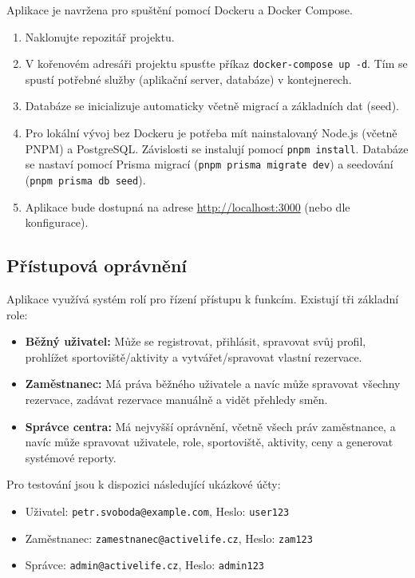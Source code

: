 \documentclass[12pt, a4paper]{article}
\begin{document}
Aplikace je navržena pro spuštění pomocí Dockeru a Docker Compose.

\begin{enumerate}
    \item Naklonujte repozitář projektu.
    \item V kořenovém adresáři projektu spusťte příkaz \texttt{docker-compose up -d}. Tím se spustí potřebné služby (aplikační server, databáze) v kontejnerech.
    \item Databáze se inicializuje automaticky včetně migrací a základních dat (seed).
    \item Pro lokální vývoj bez Dockeru je potřeba mít nainstalovaný Node.js (včetně PNPM) a PostgreSQL. Závislosti se instalují pomocí \texttt{pnpm install}. Databáze se nastaví pomocí Prisma migrací (\texttt{pnpm prisma migrate dev}) a seedování (\texttt{pnpm prisma db seed}).
    \item Aplikace bude dostupná na adrese \url{http://localhost:3000} (nebo dle konfigurace).
\end{enumerate}

\subsection{Přístupová oprávnění}
\label{subsec:pristupova_opravneni}

Aplikace využívá systém rolí pro řízení přístupu k funkcím. Existují tři základní role:

\begin{itemize}
    \item \textbf{Běžný uživatel:} Může se registrovat, přihlásit, spravovat svůj profil, prohlížet sportoviště/aktivity a vytvářet/spravovat vlastní rezervace.
    \item \textbf{Zaměstnanec:} Má práva běžného uživatele a navíc může spravovat všechny rezervace, zadávat rezervace manuálně a vidět přehledy směn.
    \item \textbf{Správce centra:} Má nejvyšší oprávnění, včetně všech práv zaměstnance, a navíc může spravovat uživatele, role, sportoviště, aktivity, ceny a generovat systémové reporty.
\end{itemize}

Pro testování jsou k dispozici následující ukázkové účty:

\begin{itemize}
    \item Uživatel: \texttt{petr.svoboda@example.com}, Heslo: \texttt{user123}
    \item Zaměstnanec: \texttt{zamestnanec@activelife.cz}, Heslo: \texttt{zam123}
    \item Správce: \texttt{admin@activelife.cz}, Heslo: \texttt{admin123}
\end{itemize}
\end{document}
